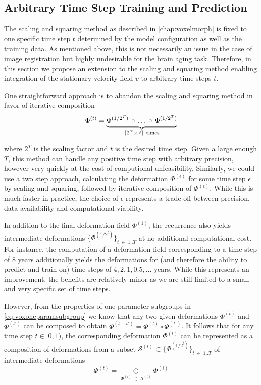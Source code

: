 \subsection{Arbitrary Time Step Training and Prediction} \label{sec:adaarbtimestep}
The scaling and squaring method as described in \autoref{chap:voxelmorph} is fixed to one specific time step $t$ determined by the model configuration as well as the training data. As mentioned above, this is not necessarily an issue in the case of image registration but highly undesirable for the brain aging task. Therefore, in this section we propose an extension to the scaling and squaring method enabling integration of the stationary velocity field $v$ to arbitrary time steps $t$.

One straightforward approach is to abandon the scaling and squaring method in favor of iterative composition
\begin{equation}
	\Phi^{(t)} =
	\underbrace{
		\Phi^{(1 / 2^T)} \, \circ \, \ldots \, \circ \, \Phi^{(1 / 2^T)} \vphantom{\Phi^{(1 / 2^T)}_2}
	}_{\lceil 2^T \times \: t \rceil \ \text{times}}
\end{equation}

where $2^T$ is the scaling factor and $t$ is the desired time step. Given a large enough $T$, this method can handle any positive time step with arbitrary precision, however very quickly at the cost of computional unfeasibility. Similarly, we could use a two step approach, calculating the deformation $\Phi^{(\epsilon)}$ for some time step $\epsilon$ by scaling and squaring, followed by iterative composition of $\Phi^{(\epsilon)}$. While this is much faster in practice, the choice of $\epsilon$ represents a trade-off between precision, data availability and computational viability.

In addition to the final deformation field $\Phi^{(1)}$, the recurrence also yields intermediate deformations $\{ \Phi^{(1 / 2^{t})} \}_{t \; \in \; 1 .. T} $ at no additional computational cost. For instance, the computation of a deformation field corresponding to a time step of 8 years additionally yields the deformations for (and therefore the ability to predict and train on) time steps of ${ 4, 2, 1, 0.5, \ldots }$ years. While this represents an improvement, the benefits are relatively minor as we are still limited to a small and very specific set of time steps.

However, from the properties of one-parameter subgroups in \autoref{eq:voxoneparamsubgroup} we know that any two given deformations $\Phi^{(t)}$ and $\Phi^{(t')}$ can be composed to obtain ${ \Phi^{(t + t')} = \Phi^{(t)} \circ \Phi^{(t')} }$. It follows that for any time step $t \in [0, 1)$, the corresponding deformation $\Phi^{(t)}$ can be represented as a composition of deformations from a subset $\mathcal{S}^{(t)} \subset \{ \Phi^{(1 / 2^{t})} \}_{t \; \in \; 1 .. T} $ of intermediate deformations
\begin{equation}
	\Phi^{(t)} = \underset{\Phi^{(i)} \; \in \; \mathcal{S}^{(t)}}{\bigcirc} \Phi^{(i)}
\end{equation}

